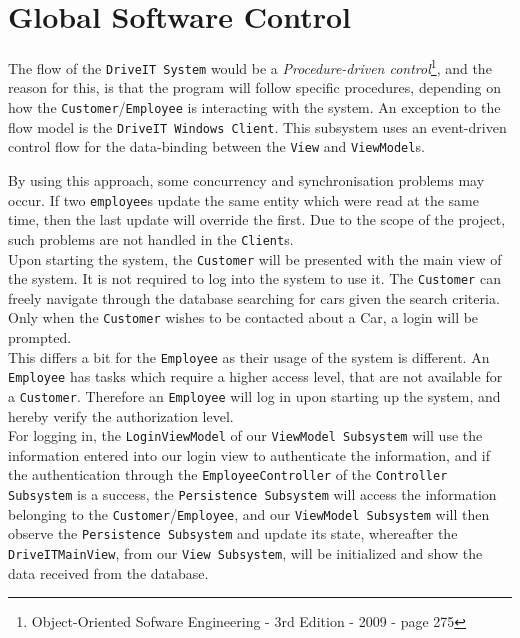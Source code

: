 \section{Global Software Control}

The flow of the \texttt{DriveIT System} would be a \textit{Procedure-driven control}\footnote{{Object-Oriented Sofware Engineering - 3rd Edition - 2009 - page 275}}, and the reason for this, is that the program will follow specific procedures, depending on how the \texttt{Customer}/\texttt{Employee} is interacting with the system. An exception to the flow model is the \texttt{DriveIT Windows Client}. This subsystem uses an event-driven control flow for the data-binding between the \texttt{View} and \texttt{ViewModel}s.

By using this approach, some concurrency and synchronisation problems may occur. If two \texttt{employee}s update the same entity which were read at the same time, then the last update will override the first. Due to the scope of the project, such problems are not handled in the \texttt{Client}s.\\

Upon starting the system, the \texttt{Customer} will be presented with the main view of the system. It is not required to log into the system to use it. The \texttt{Customer} can freely navigate through the database searching for cars given the search criteria. Only when the \texttt{Customer} wishes to be contacted about a Car, a login will be prompted.\\ 

This differs a bit for the \texttt{Employee} as their usage of the system is different. An \texttt{Employee} has tasks which require a higher access level, that are not available for a \texttt{Customer}. Therefore an \texttt{Employee} will log in upon starting up the system, and hereby verify the authorization level.\\

For logging in, the \texttt{LoginViewModel} of our \texttt{ViewModel Subsystem} will use the information entered into our login view to authenticate the information, and if the authentication through the \texttt{EmployeeController} of the \texttt{Controller Subsystem} is a success, the \texttt{Persistence Subsystem} will access the information belonging to the \texttt{Customer}/\texttt{Employee}, and our \texttt{ViewModel Subsystem} will then observe the \texttt{Persistence Subsystem} and update its state, whereafter the \texttt{DriveITMainView}, from our \texttt{View Subsystem}, will be initialized and show the data received from the database.\\

